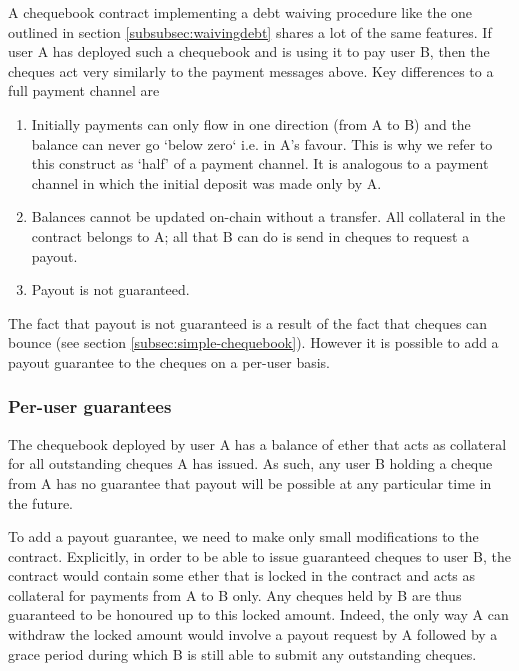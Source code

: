 A chequebook contract implementing a debt waiving procedure like the one outlined in section \ref{subsubsec:waivingdebt} shares a lot of the same features. If user A has deployed such a chequebook and is using it to pay user B, then the cheques act very similarly to the payment messages above. Key differences to a full payment channel are

\begin{enumerate}
    \item Initially payments can only flow in one direction (from A to B) and the balance can never go `below zero` i.e. in A's favour. This is why we refer to this construct as `half' of a payment channel. It is analogous to a payment channel in which the initial deposit was made only by A.
    \item Balances cannot be updated on-chain without a transfer. All collateral in the contract belongs to A; all that B can do is send in cheques to request a payout.%
    \item Payout is not guaranteed. 
\end{enumerate}

The fact that payout is not guaranteed is a result of the fact that cheques can bounce (see section \ref{subsec:simple-chequebook}). However it is possible to add a payout guarantee to the cheques on a per-user basis.

\subsubsection{Per-user guarantees}\label{subsubsec:per-user-guarantees}

The chequebook deployed by user A has a balance of ether that acts as collateral for all outstanding cheques A has issued. As such, any user B holding a cheque from A has no guarantee that payout will be possible at any particular time in the future. 

To add a payout guarantee, we need to make only small modifications to the contract. Explicitly, in order to be able to issue guaranteed cheques to user B, the contract would contain some ether that is locked in the contract and acts as collateral for payments from A to B only. Any cheques held by B are thus guaranteed to be honoured up to this locked amount. Indeed, the only way A can withdraw the locked amount would involve a payout request by A followed by a grace period during which B is still able to submit any outstanding cheques.

